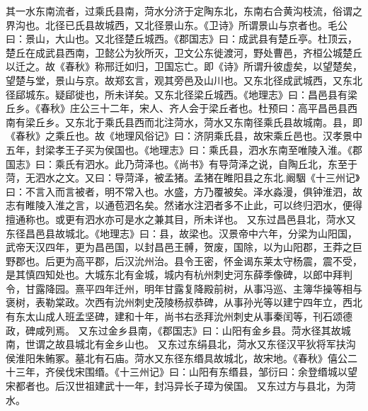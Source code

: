 \documentclass[12pt,UTF8]{ctexbook}
\begin{document}
其一水东南流者，过乘氏县南，菏水分济于定陶东北，东南右合黄沟枝流，俗谓之界沟也。北径已氏县故城西，又北径景山东。《卫诗》所谓景山与京者也。毛公曰：景山，大山也。又北径楚丘城西。《郡国志》曰：成武县有楚丘亭。杜顶云，楚丘在成武县西南，卫懿公为狄所灭，卫文公东徙渡河，野处曹邑，齐桓公城楚丘以迁之。故《春秋》称邢迁如归，卫国忘亡。即《诗》所谓升彼虚矣，以望楚矣，望楚与堂，景山与京。故郑玄言，观其旁邑及山川也。又东北径成武城西，又东北径郈城东。疑郈徙也，所未详矣。又东北径梁丘城西。《地理志》曰：昌邑县有梁丘乡。《春秋》庄公三十二年，宋人、齐人会于梁丘者也。杜预曰：高平昌邑县西南有梁丘乡。又东北于乘氏县西而北注菏水，菏水又东南径乘氏县故城南。县，即《春秋》之乘丘也。故《地理风俗记》曰：济阴乘氏县，故宋乘丘邑也。汉孝景中五年，封梁孝王子买为侯国也。《地理志》曰：乘氏县，泗水东南至唯陵入淮。《郡国志》曰：乘氏有泗水。此乃菏泽也。《尚书》有导菏泽之说，自陶丘北，东至于菏，无泗水之文。又曰：导菏泽，被孟猪。孟猪在睢阳县之东北.阚駰《十三州记》曰：不言入而言被者，明不常入也。水盛，方乃覆被矣。泽水淼漫，俱钟淮泗，故志有睢陵入淮之言，以通苞泗名矣。然诸水注泗者多不止此，可以终归泗水，便得擅通称也。或更有泗水亦可是水之兼其目，所未详也。
又东过昌邑县北，菏水又东径昌邑县故城北。《地理志》曰：县，故梁也。汉景帝中六年，分梁为山阳国，武帝天汉四年，更为昌邑国，以封昌邑王髆，贺废，国除，以为山阳郡，王莽之巨野郡也。后更为高平郡，后汉沇州治。县令王密，怀金谒东莱太守杨震，震不受，是其慎四知处也。大城东北有金城，城内有杭州刺史河东薛季像碑，以郎中拜判令，甘露降园。熹平四年迁州，明年甘露复降殿前树，从事冯巡、主簿华操等相与褒树，表勒棠政。次西有沇州刺史茂陵杨叔恭碑，从事孙光等以建宁四年立，西北有东太山成人班孟坚碑，建和十年，尚书右丞拜沇州刺史从事秦闰等，刊石颂德政，碑咸列焉。
又东过金乡县南，《郡国志》曰：山阳有金乡县。菏水径其故城南，世谓之故县城北有金乡山也。
又东过东绢县北，菏水又东径汉平狄将军扶沟侯淮阳朱鲔冢。墓北有石庙。菏水又东径东缗具故城北，故宋地。《春秋》僖公二十三年，齐侯伐宋围缗。《十三州记》曰：山阳有东缗县，邹衍曰：余登缗城以望宋都者也。后汉世祖建武十一年，封冯异长子璋为侯国。
又东过方与县北，为菏水。
\end{document}
